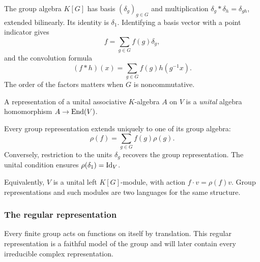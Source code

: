 
\begin{defn}
\label{defn-algebra-group}\label{notation-71}\label{notation-72}
The group algebra $K[G]$ has basis $(\delta_g)_{g\in G}$ and multiplication
$\delta_g*\delta_h=\delta_{gh}$, extended bilinearly. Its identity is
$\delta_1$. Identifying a basis vector with a point indicator gives
\begin{equation}
\label{eq-decomposition-function-f}
 f=\sum_{g\in G}f(g)\delta_g,
\end{equation}
and the convolution formula
\[
 (f*h)(x)=\sum_{g\in G}f(g)h(g^{-1}x).
\]
The order of the factors matters when $G$ is noncommutative.
\end{defn}


\begin{defn}
\label{defn-repr-algebre}
A representation of a unital associative $K$-algebra $A$ on $V$ is a
\emph{unital} algebra homomorphism $A\to\operatorname{End}(V)$.
\end{defn}
Every group representation extends uniquely to one of its group algebra:
\[
 \rho(f)=\sum_{g\in G}f(g)\rho(g).
\]
Conversely, restriction to the units $\delta_g$ recovers the group
representation. The unital condition ensures $\rho(\delta_1)=\operatorname{Id}_V$.


\begin{rem}[Modules]
\label{rmk-representations-modules}
Equivalently, $V$ is a unital left $K[G]$-module, with action
$f\cdot v=\rho(f)v$. Group representations and such modules are two
languages for the same structure.
\end{rem}

\subsubsection{The regular representation}
\label{sect3-regular-representation}

Every finite group acts on functions on itself by translation. This regular
representation is a faithful model of the group and will later contain every
irreducible complex representation.

